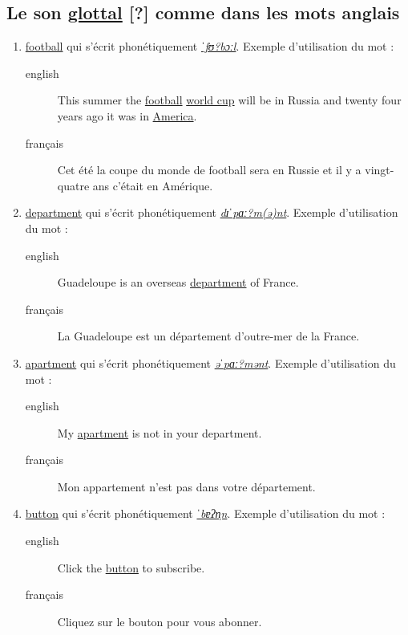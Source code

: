 \subsection{Le son \href{https://en.wikipedia.org/wiki/Glottal\_stop}{glottal} [?] comme dans les mots anglais}
\label{sec:org630b613}
\begin{enumerate}
\item \href{http://www.wordreference.com/enfr/football}{football} qui s'écrit phonétiquement \href{https://www.phon.ucl.ac.uk/home/wells/phoneticsymbolsforenglish.htm}{\emph{ˈfʊ?bɔːl}}. Exemple d'utilisation du mot :
\begin{description}
\item[{english}] \textenglish{This summer the \href{https://youtu.be/6v5Ao0tYhBw}{football} \href{https://youtu.be/zVr3dTMY9Ag}{world cup} will be in Russia
and twenty four years ago it was in \href{https://youtu.be/mAYvjOzh1ag}{America}.}
\item[{français}] Cet été la coupe du monde de football sera en Russie
et il y a vingt-quatre ans c'était en Amérique.
\end{description}
\item \href{http://www.wordreference.com/enfr/department}{department} qui s'écrit phonétiquement \href{https://en.oxforddictionaries.com/definition/department}{\emph{dɪˈpɑː?m(ə)nt}}. Exemple d'utilisation du mot :
\begin{description}
\item[{english}] \textenglish{Guadeloupe is an overseas \href{https://youtu.be/0CUWPGLVRoU}{department} of France.}
\item[{français}] La Guadeloupe est un département d'outre-mer de la
France.
\end{description}
\item \href{http://www.wordreference.com/enfr/apartment}{apartment} qui s'écrit phonétiquement \href{https://tophonetics.com/}{\emph{əˈpɑː?mənt}}. Exemple d'utilisation du mot :
\begin{description}
\item[{english}] \textenglish{My \href{https://youtu.be/H0HjU9956Z8}{apartment} is not in your department.}
\item[{français}] Mon appartement n'est pas dans votre département.
\end{description}
\item \href{http://www.wordreference.com/enfr/button}{button} qui s'écrit phonétiquement \href{https://en.wikipedia.org/wiki/Glottal\_stop}{\emph{ˈbɐʔn̩n}}. Exemple d'utilisation du mot :
\begin{description}
\item[{english}] \textenglish{Click the \href{https://youtu.be/IJcwc5Gz8K0}{button} to subscribe.}
\item[{français}] Cliquez sur le bouton pour vous abonner.
\end{description}
\end{enumerate}
